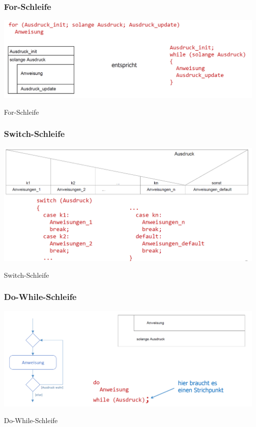 		\subsubsection{For-Schleife}
			\begin{minipage}{.45\linewidth}
				\includegraphics[width=0.95\linewidth]{Bilder/forschleife.png}
			\end{minipage}
			\hfill
			\begin{minipage}{.5\linewidth}
				For-Schleife
			\end{minipage}

		\subsubsection{Switch-Schleife}
			\begin{minipage}{.45\linewidth}
				\includegraphics[width=0.95\linewidth]{Bilder/Switch.png}
			\end{minipage}
			\hfill
			\begin{minipage}{.5\linewidth}
				Switch-Schleife
			\end{minipage}

		\subsubsection{Do-While-Schleife}
			\begin{minipage}{.45\linewidth}
				\includegraphics[width=0.95\linewidth]{Bilder/dowhile.png}
			\end{minipage}
			\hfill
			\begin{minipage}{.5\linewidth}
				Do-While-Schleife
			\end{minipage}

